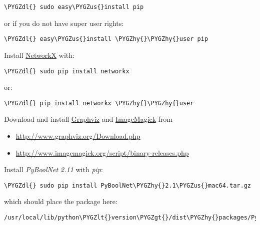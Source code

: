 \documentclass[letterpaper,10pt,english]{sphinxmanual}
\def\PYGZus{\char`\_}
\def\PYGZlt{\char`\<}
\def\PYGZgt{\char`\>}
\def\PYGZdl{\char`\$}
\def\PYGZhy{\char`\-}
\begin{document}
\begin{Verbatim}[commandchars=\\\{\}]
\PYGZdl{} sudo easy\PYGZus{}install pip
\end{Verbatim}

or if you do not have super user rights:

\begin{Verbatim}[commandchars=\\\{\}]
\PYGZdl{} easy\PYGZus{}install \PYGZhy{}\PYGZhy{}user pip
\end{Verbatim}

Install \href{https://networkx.github.io/}{NetworkX} with:

\begin{Verbatim}[commandchars=\\\{\}]
\PYGZdl{} sudo pip install networkx
\end{Verbatim}

or:

\begin{Verbatim}[commandchars=\\\{\}]
\PYGZdl{} pip install networkx \PYGZhy{}\PYGZhy{}user
\end{Verbatim}

Download and install \href{http://www.graphviz.org/}{Graphviz} and \href{http://www.imagemagick.org/script/index.php}{ImageMagick} from
\begin{itemize}
\item {} 
\href{http://www.graphviz.org/Download.php}{http://www.graphviz.org/Download.php}

\item {} 
\href{http://www.imagemagick.org/script/binary-releases.php}{http://www.imagemagick.org/script/binary-releases.php}

\end{itemize}

Install \emph{PyBoolNet 2.11} with \emph{pip}:

\begin{Verbatim}[commandchars=\\\{\}]
\PYGZdl{} sudo pip install PyBoolNet\PYGZhy{}2.1\PYGZus{}mac64.tar.gz
\end{Verbatim}

which should place the package here:

\begin{Verbatim}[commandchars=\\\{\}]
/usr/local/lib/python\PYGZlt{}version\PYGZgt{}/dist\PYGZhy{}packages/PyBoolNet
\end{Verbatim}
\end{document}
